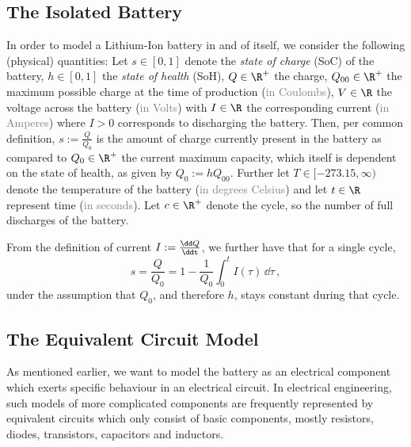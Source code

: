 \documentclass{prettytex/ox/mmsc-special-topic}
\begin{document}
  \subsection{The Isolated Battery}
  In order to model a Lithium-Ion battery in and of itself, we consider the following (physical) quantities:
  Let
  $s \in [0, 1]$ denote the \textit{state of charge} (SoC) of the battery,
  $h \in [0, 1]$ the \textit{state of health} (SoH),
  $Q \in \R^+$ the charge,
  $Q_{00} \in \R^+$ the maximum possible charge at the time of production (\textcolor{gray}{in Coulombs}),
  $V \in \R$ the voltage across the battery (\textcolor{gray}{in Volts}) with
  $I \in \R$ the corresponding current (\textcolor{gray}{in Amperes}) where $I > 0$ corresponds to discharging the battery.
  Then, per common definition, $s := \frac{Q}{Q_0}$ is the amount of charge currently present in the battery as compared to $Q_0 \in \R^+$ the current maximum capacity, which itself is dependent on the state of health, as given by $Q_0 := h Q_{00}$.
  Further let
  $T \in [-273.15, \infty)$ denote the temperature of the battery (\textcolor{gray}{in degrees Celsius}) and
  let $t \in \R$ represent time (\textcolor{gray}{in seconds}).
  Let $c \in \R^+$ denote the cycle, so the number of full discharges of the battery.

  From the definition of current $I := \frac{\dd Q}{\ddt}$, we further have that for a single cycle,
  $$s = \frac{Q}{Q_0} = 1 - \frac{1}{Q_0} \int_0^t I(\tau) \,\dd\tau \,,$$
  under the assumption that $Q_0$, and therefore $h$, stays constant during that cycle.

  \subsection{The Equivalent Circuit Model}
  As mentioned earlier, we want to model the battery as an electrical component which exerts specific behaviour in an electrical circuit.
  In electrical engineering, such models of more complicated components are frequently represented by equivalent circuits which only consist of basic components, mostly resistors, diodes, transistors, capacitors and inductors.
\end{document}

